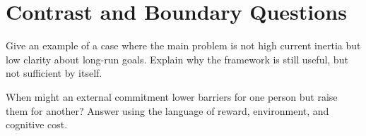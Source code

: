 \section{Contrast and Boundary Questions}

\begin{exercisebox}
\begin{exercise}
Give an example of a case where the main problem is not high current inertia
but low clarity about long-run goals. Explain why the framework is still
useful, but not sufficient by itself.
\end{exercise}

\begin{exercise}
When might an external commitment lower barriers for one person but raise them
for another? Answer using the language of reward, environment, and cognitive
cost.
\end{exercise}
\end{exercisebox}
